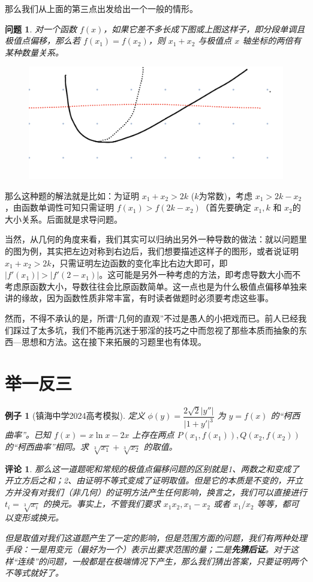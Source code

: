 \documentclass[a4paper,10pt]{article}
\newtheorem{example}{例子}
\newtheorem{remark}{评论}
\newtheorem{problem}{问题}
\begin{document}
那么我们从上面的第三点出发给出一个一般的情形。
\begin{problem}
    对一个函数 $ f(x)  $，如果它差不多长成下图或上图这样子，即分段单调且极值点偏移，那么若 $ f(x_1)=f(x_2) $，则 $ x_1+x_2 $ 与极值点 $ x  $ 轴坐标的两倍有某种数量关系。  
\end{problem}
\begin{figure}[htbp]
    \centering
    \includegraphics[scale=0.5]{图片1.png}
\end{figure}

那么这种题的解法就是比如：为证明 $ x_1+x_2>2k $ ($ k $为常数)，考虑 $ x_1>2k-x_2 $，由函数单调性可知只需证明 $ f(x_1)>f(2k-x_2) $（首先要确定 $ x_1,k  $ 和 $ x_2 $的大小关系。后面就是求导问题。 

当然，从几何的角度来看，我们其实可以归纳出另外一种导数的做法：就以问题里的图为例，其实把左边对称到右边后，我们想要描述这样子的图形，或者说证明 $ x_1+x_2>2k  $，只需证明左边函数的变化率比右边大即可，即 $ |f'(x_1)|>|f'(2-x_1)| $。这可能是另外一种考虑的方法，即考虑导数大小而不考虑原函数大小，导数往往会比原函数简单。这一点也是为什么极值点偏移单独来讲的缘故，因为函数性质非常丰富，有时读者做题时必须要考虑这些事。

然而，不得不承认的是，所谓“几何的直观”不过是愚人的小把戏而已。前人已经我们踩过了太多坑，我们不能再沉迷于邪淫的技巧之中而忽视了那些本质而抽象的东西---思想和方法。这在接下来拓展的习题里也有体现。
\section{举一反三}
\begin{example}[镇海中学2024高考模拟]
    定义 $ \phi(y)=\dfrac{2\sqrt{2}|y''|}{|1+y'|^3} $ 为 $ y=f(x) $ 的“柯西曲率”。已知 $ f(x)=x\ln x-2x $ 上存在两点 $ P(x_1,f(x_1)),Q(x_2,f(x_2)) $ 的“柯西曲率”相同。求 $ \sqrt[3]{x_1}+\sqrt[3]{x_2} $ 的取值。
\end{example}
\begin{remark}
    那么这一道题呢和常规的极值点偏移问题的区别就是1、两数之和变成了开立方后之和；2、由证明不等式变成了证明取值。但是它的本质是不变的，开立方并没有对我们（非几何）的证明方法产生任何影响，换言之，我们可以直接进行 $ t_i=\sqrt[3]{x_i } $ 的换元。事实上，不管我们要求 $ x_1x_2,x_1-x_2 $ 或者 $ x_1/x_2 $ 等等，都可以变形或换元。
    
    但是取值对我们这道题产生了一定的影响，但是范围方面的问题，我们有两种处理手段：一是用变元（最好为一个）表示出要求范围的量；二是\textbf{先猜后证}。对于这样“连续”的问题，一般都是在极端情况下产生，那么我们猜出答案，只要证明两个不等式就好了。
\end{remark}
\end{document}
